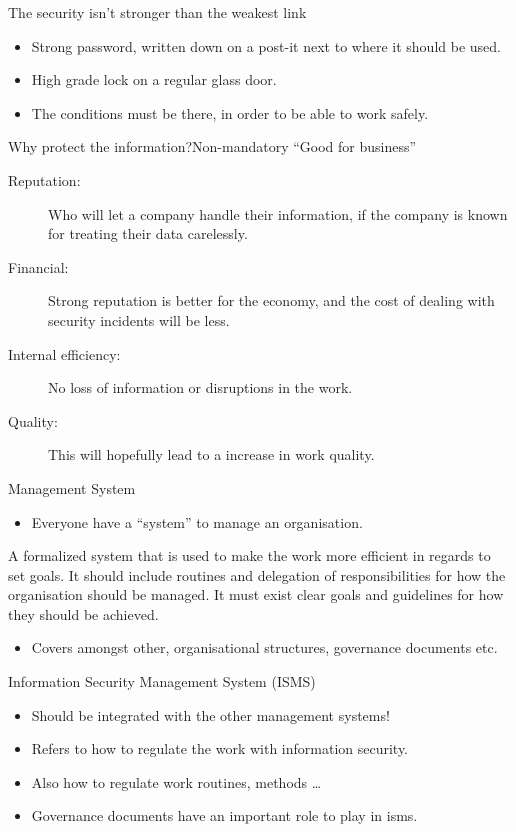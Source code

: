 \documentclass{beamer}
\begin{document}
\begin{frame}{The security isn't stronger than the weakest link}
  \begin{itemize}
    \item Strong password, written down on a post-it next to where it should be
      used.
    \item High grade lock on a regular glass door.
    \item The conditions must be there, in order to be able to work safely.
  \end{itemize}
\end{frame}

\begin{frame}{Why protect the information?}{Non-mandatory}
  \enquote{Good for business}
  \begin{description}
    \item[Reputation:] Who will let a company handle their information, if the
      company is known for treating their data carelessly.
    \item[Financial:] Strong reputation is better for the economy, and the cost
      of dealing with security incidents will be less.
    \item[Internal efficiency:] No loss of information or disruptions in the
      work.
    \item[Quality:] This will hopefully lead to a increase in work quality.
  \end{description}
\end{frame}

\begin{frame}{Management System}
  \begin{itemize}
    \item Everyone have a \enquote{system} to manage an organisation.
  \end{itemize}
      A formalized system that is used to make the work more efficient in
      regards to set goals. It should include routines and delegation of
      responsibilities for how the organisation should be managed. It must exist
      clear goals and guidelines for how they should be achieved.
  \begin{itemize}
    \item Covers amongst other, organisational structures, governance documents
      etc.
  \end{itemize}
\end{frame}

\begin{frame}{Information Security Management System (ISMS)}
  \begin{itemize}
    \item Should be integrated with the other management systems!
    \item Refers to how to regulate the work with information security.
    \item Also how to regulate work routines, methods \dots
    \item Governance documents have an important role to play in \ac{isms}\@.
  \end{itemize}
\end{frame}
\end{document}
